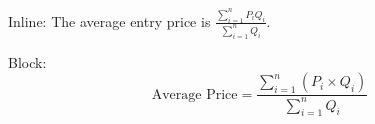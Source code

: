 Inline: The average entry price is $\displaystyle\frac{\sum_{i=1}^{n} P_i Q_i}{\sum_{i=1}^{n} Q_i}$.

Block:
$$
\text{Average Price} = \frac{\displaystyle\sum_{i=1}^{n} (P_i \times Q_i)}{\displaystyle\sum_{i=1}^{n} Q_i}
$$

